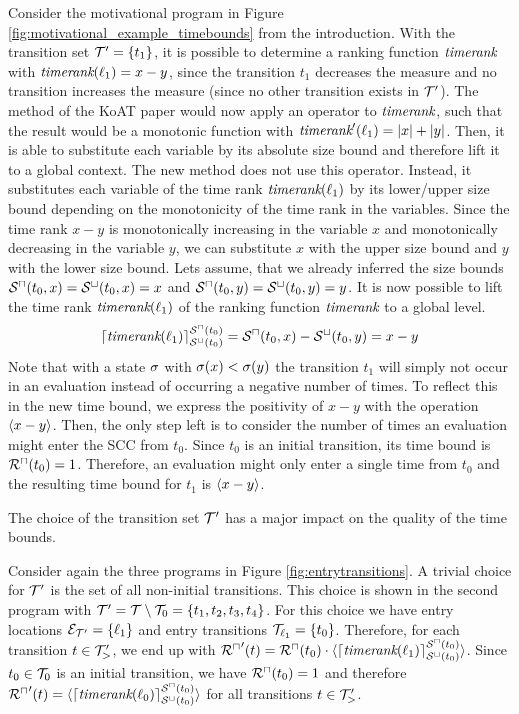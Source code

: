 \begin{example}[TimeBounds]
  
  Consider the motivational program in Figure \ref{fig:motivational_example_timebounds} from the introduction.
  With the transition set $\mathcal{T}' = \lbrace t_1 \rbrace$, it is possible to determine a ranking function $\emph{timerank}$ with $\emph{timerank}(\ell_1) = x - y$, since the transition $t_1$ decreases the measure and no transition increases the measure (since no other transition exists in $\mathcal{T}'$).
  The method of the KoAT paper \cite{koat} would now apply an operator to $\emph{timerank}$, such that the result would be a monotonic function with $\emph{timerank}'(\ell_1) = \left|x\right| + \left|y\right|$.
  Then, it is able to substitute each variable by its absolute size bound and therefore lift it to a global context.
  The new method does not use this operator.
  Instead, it substitutes each variable of the time rank $\emph{timerank}(\ell_1)$ by its lower/upper size bound depending on the monotonicity of the time rank in the variables.
  Since the time rank $x-y$ is monotonically increasing in the variable $x$ and monotonically decreasing in the variable $y$, we can substitute $x$ with the upper size bound and $y$ with the lower size bound.
  Lets assume, that we already inferred the size bounds ${\mathcal{S}^\sqcap}(t_0,x) = {\mathcal{S}^\sqcup}(t_0,x) = x$ and ${\mathcal{S}^\sqcap}(t_0,y) = {\mathcal{S}^\sqcup}(t_0,y) = y$.
  It is now possible to lift the time rank $\emph{timerank}(\ell_1)$ of the ranking function $\emph{timerank}$ to a global level.
  \[ \lceil \emph{timerank}(\ell_1) \rceil^{{\mathcal{S}^\sqcap}(t_0)}_{{\mathcal{S}^\sqcup}(t_0)} = {\mathcal{S}^\sqcap}(t_0, x) - {\mathcal{S}^\sqcup}(t_0, y) = x - y \]
  Note that with a state $\sigma$ with $\sigma(x) < \sigma(y)$ the transition $t_1$ will simply not occur in an evaluation instead of occurring a negative number of times.
  To reflect this in the new time bound, we express the positivity of $x - y$ with the operation $\langle x - y\rangle$.
  Then, the only step left is to consider the number of times an evaluation might enter the SCC from $t_0$.
  Since $t_0$ is an initial transition, its time bound is ${\mathcal{R}^\sqcap}(t_0) = 1$.
  Therefore, an evaluation might only enter a single time from $t_0$ and the resulting time bound for $t_1$ is $\langle x - y\rangle$.
\end{example}

The choice of the transition set $\mathcal{T}'$ has a major impact on the quality of the time bounds.

Consider again the three programs in Figure \ref{fig:entrytransitions}.
A trivial choice for $\mathcal{T}'$ is the set of all non-initial transitions.
This choice is shown in the second program with $\mathcal{T}' = \mathcal{T} \setminus \mathcal{T}_0 = \lbrace t_1, t_2, t_3, t_4 \rbrace$.
For this choice we have entry locations $\mathcal{E}_{\mathcal{T}'} = \lbrace \ell_1 \rbrace$ and entry transitions $\mathcal{T}_{\ell_1} = \lbrace t_0 \rbrace$.
Therefore, for each transition $t \in \mathcal{T}'_>$, we end up with ${\mathcal{R}^\sqcap}'(t) = {\mathcal{R}^\sqcap}(t_0) \cdot \langle\lceil \emph{timerank}(\ell_1) \rceil^{{\mathcal{S}^\sqcap}(t_0)}_{{\mathcal{S}^\sqcup}(t_0)}\rangle$.
Since $t_0 \in \mathcal{T}_0$ is an initial transition, we have ${\mathcal{R}^\sqcap}(t_0) = 1$ and therefore ${\mathcal{R}^\sqcap}'(t) = \langle\lceil \emph{timerank}(\ell_0) \rceil^{{\mathcal{S}^\sqcap}(t_0)}_{{\mathcal{S}^\sqcup}(t_0)}\rangle$ for all transitions $t \in \mathcal{T}'_>$.

